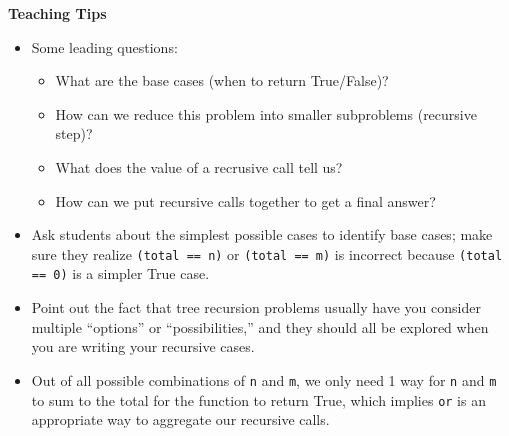     \begin{guide}
    \begin{blocksection}
    \textbf{Teaching Tips}
    \begin{itemize}
        \item Some leading questions:
        \begin{itemize}
            \item What are the base cases (when to return True/False)?
            \item How can we reduce this problem into smaller subproblems (recursive step)?
            \item What does the value of a recrusive call tell us?
            \item How can we put recursive calls together to get a final answer?
        \end{itemize}
        \item Ask students about the simplest possible cases to identify base cases; make sure they realize \lstinline{(total == n)} or \lstinline{(total == m)}  is incorrect because \lstinline{(total == 0)} is a simpler True case.
        \item Point out the fact that tree recursion problems usually have you consider multiple “options” or “possibilities,” and they should all be explored when you are writing your recursive cases.
        \item Out of all possible combinations of \lstinline{n} and \lstinline{m}, we only need 1 way for \lstinline{n} and \lstinline{m} to sum to the total for the function to return True, which implies \lstinline{or} is an appropriate way to aggregate our recursive calls.
    \end{itemize}
    \end{blocksection}
    \end{guide}
    